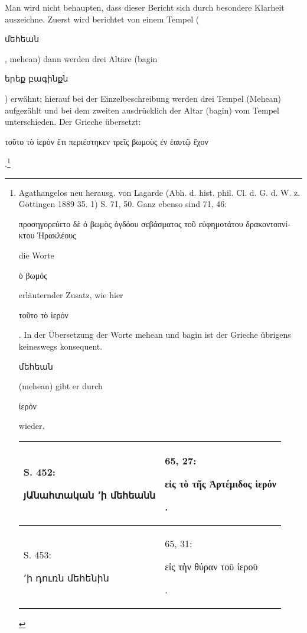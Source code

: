 \documentclass{article}
\begin{document}
Man wird nicht behaupten, dass dieser Bericht sich durch besondere Klarheit auszeichne. Zuerst wird berichtet von einem Tempel (\begin{armenian}մեհեան\end{armenian}, mehean) dann werden drei Altäre (bagin \begin{armenian}երեք բագինքն\end{armenian}) erwähnt; hierauf bei der Einzelbeschreibung werden drei Tempel (Mehean) aufgezählt und bei dem zweiten ausdrücklich der Altar (bagin) vom Tempel unterschieden. Der Grieche übersetzt: \begin{greek}τοῦτο τὸ ἱερὸν ἔτι περιέστηκεν τρεῖς βωμοὺς ἐν ἑαυτῷ ἔχον\end{greek}.\footnote{Agathangelos neu herausg. von Lagarde (Abh. d. hist. phil. Cl. d. G. d. W. z. Göttingen 1889 35. 1) S. 71, 50. Ganz ebenso sind 71, 46: \begin{greek}προσηγορεύετο δὲ ὁ βωμὸς ὀγδόου σεβάσματος τοῦ εὐφημοτάτου δρακοντοπνίκτου Ἡρακλέους\end{greek} die Worte \begin{greek}ὁ βωμός\end{greek} erläuternder Zusatz, wie hier \begin{greek}τοῦτο τὸ ἱερόν\end{greek}. In der Übersetzung der Worte mehean und bagin ist der Grieche übrigens keineswegs konsequent. \begin{armenian}մեհեան\end{armenian} (mehean) gibt er durch \begin{greek}ἱερόν\end{greek} wieder.\hspace*{5mm}\begin{table}[H]
    \centering
    \color{armeniaRed}
    \footnotesize
    \bfseries
    \begin{tabular}{p{45mm}|p{45mm}}
    \hline
        S. 452: \begin{armenian}յԱնահտական  ՚ի մեհեանն\end{armenian} & 65, 27: \begin{greek}εἰς τὸ τῆς Ἀρτέμιδος ἱερόν\end{greek}.   \\ \hline
        S. 453: \begin{armenian}՚ի դուռն մեհենին\end{armenian} & 65, 31: \begin{greek}εἰς τὴν θύραν τοῦ ἱεροῦ\end{greek}.   \\ \hline

\end{tabular}
\end{table}}
\end{document}
